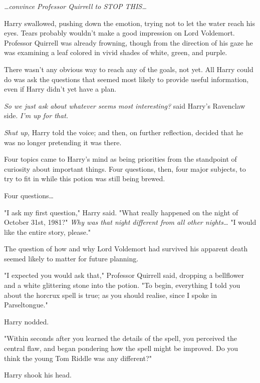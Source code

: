 \emph{{\ldots}convince Professor Quirrell to STOP THIS{\ldots}}

Harry swallowed, pushing down the emotion, trying not to let the water reach 
his eyes. Tears probably wouldn't make a good impression on Lord Voldemort. 
Professor Quirrell was already frowning, though from the direction of his gaze 
he was examining a leaf colored in vivid shades of white, green, and purple.

There wasn't any obvious way to reach any of the goals, not yet. All Harry 
could do was ask the questions that seemed most likely to provide useful 
information, even if Harry didn't yet have a plan.

\emph{So we just ask about whatever seems most interesting?} said Harry's 
Ravenclaw side. \emph{I'm up for that.}

\emph{Shut up,} Harry told the voice; and then, on further reflection, decided 
that he was no longer pretending it was there.

Four topics came to Harry's mind as being priorities from the standpoint of 
curiosity about important things. Four questions, then, four major subjects, to 
try to fit in while this potion was still being brewed.

Four questions{\ldots}

"I ask my first question," Harry said. "What really happened on the night of 
October 31st, 1981?" \emph{Why was that night different from all other 
nights{\ldots}} "I would like the entire story, please."

The question of how and why Lord Voldemort had survived his apparent death 
seemed likely to matter for future planning.

"I expected you would ask that," Professor Quirrell said, dropping a bellflower 
and a white glittering stone into the potion. "To begin, everything I told you 
about the horcrux spell is true; as you should realise, since I spoke in 
Parseltongue."

Harry nodded.

"Within seconds after you learned the details of the spell, you perceived the 
central flaw, and began pondering how the spell might be improved. Do you think 
the young Tom Riddle was any different?"

Harry shook his head.


